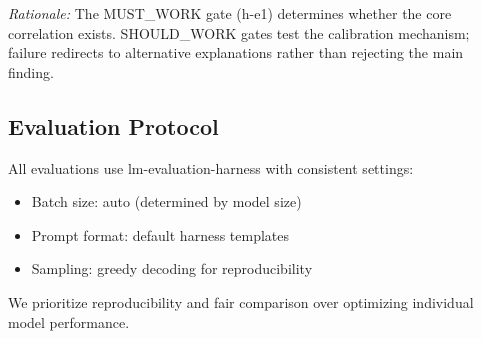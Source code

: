 \emph{Rationale:} The MUST\_WORK gate (h-e1) determines whether the core correlation exists. SHOULD\_WORK gates test the calibration mechanism; failure redirects to alternative explanations rather than rejecting the main finding.

\subsection{Evaluation Protocol}

All evaluations use lm-evaluation-harness \cite{gao2023lmeval} with consistent settings:
\begin{itemize}
    \item Batch size: auto (determined by model size)
    \item Prompt format: default harness templates
    \item Sampling: greedy decoding for reproducibility
\end{itemize}

We prioritize reproducibility and fair comparison over optimizing individual model performance.
